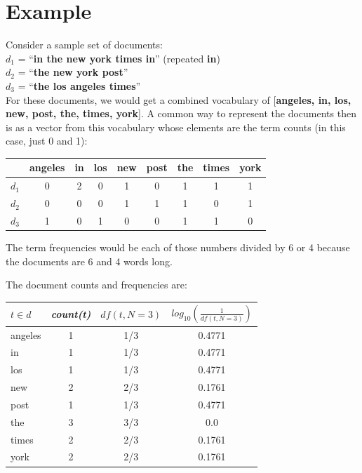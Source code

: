 \documentclass[10pt]{article}
\begin{document}
\section{Example}

Consider a sample set of documents:
\\

\noindent $d_1$ = ``{\bf in the new york times in}'' (repeated {\bf in})\\
$d_2$ = ``{\bf the new york post}''\\
$d_3$ = ``{\bf the los angeles times}''
\\

For these documents, we would get a combined vocabulary of [{\bf angeles, in, los, new, post, the, times, york}].   A common way to represent the documents then is as a vector from this vocabulary whose elements are the term counts (in this case, just 0 and 1):

\begin{table}[H]
\begin{center}
\begin{tabular}{c|c|c|c|c|c|c|c|c}
 & angeles & in & los & new & post & the & times & york\\
\hline
$d_1$ & 0 & 2 & 0 & 1 & 0 & 1 & 1 & 1\\
$d_2$ & 0 & 0 & 0 & 1 & 1 & 1 & 0 & 1\\
$d_3$ & 1 & 0 & 1 & 0 & 0 & 1 & 1 & 0\\
\end{tabular}
\end{center}
\label{default}
\end{table}%

The term frequencies would be each of those numbers divided by 6 or 4 because the documents are 6 and 4 words long.

The document counts and frequencies are:

\begin{table}[H]
\begin{center}
\begin{tabular}{l|c|c|c}
$t \in d$ & {\em count(t)} & $df(t,N=3)$ & $log_{10}(\frac{1}{df(t,N=3)})$\\
\hline
angeles & 1 & 1/3 & 0.4771\\
in & 1 & 1/3 & 0.4771\\
 los & 1 & 1/3 & 0.4771\\
  new & 2& 2/3 & 0.1761\\
   post & 1& 1/3& 0.4771\\ 
the & 3 & 3/3 & 0.0\\
   times & 2& 2/3 & 0.1761\\
   york& 2& 2/3 & 0.1761\\
\end{tabular}
\end{center}
\label{default}
\end{table}%
\end{document}
